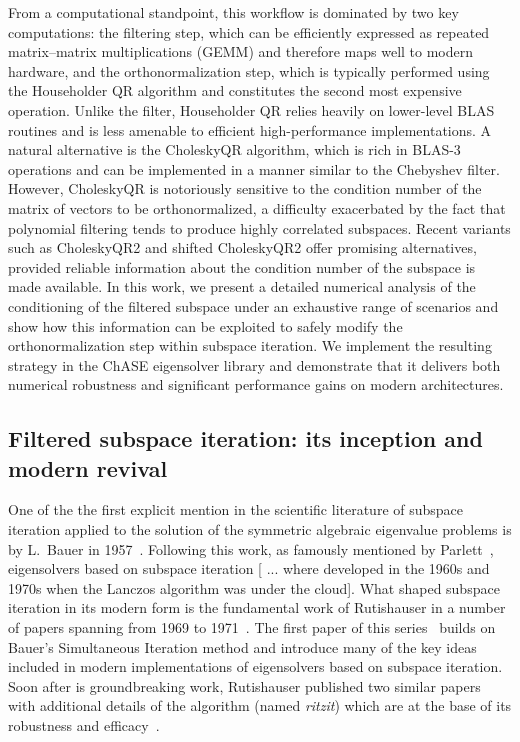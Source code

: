 From a computational standpoint, this workflow is dominated by two key computations: the filtering step, which can be efficiently expressed as repeated matrix–matrix multiplications (GEMM) and therefore maps well to modern hardware, and the orthonormalization step, which is typically performed using the Householder QR algorithm and constitutes the second most expensive operation. Unlike the filter, Householder QR relies heavily on lower-level BLAS routines and is less amenable to efficient high-performance implementations. A natural alternative is the CholeskyQR algorithm, which is rich in BLAS-3 operations and can be implemented in a manner similar to the Chebyshev filter. However, CholeskyQR is notoriously sensitive to the condition number of the matrix of vectors to be orthonormalized, a difficulty exacerbated by the fact that polynomial filtering tends to produce highly correlated subspaces. Recent variants such as CholeskyQR2 \cite{fukaya2014choleskyqr2} and shifted 
CholeskyQR2 \cite{fukaya2020shifted} offer promising alternatives, provided reliable information about the condition number of the subspace is made available. In this work, we present a detailed numerical analysis of the conditioning of the filtered subspace under an exhaustive range of scenarios and show how this information can be exploited to safely modify the 
orthonormalization step within subspace iteration. We implement the resulting strategy in 
the ChASE eigensolver library and demonstrate that it delivers both numerical robustness and significant performance gains on modern architectures.


\subsection{Filtered subspace iteration: its inception and modern revival}
One of the the first explicit mention in the scientific literature of
subspace iteration applied to the solution of the symmetric algebraic
eigenvalue problems is by L.~Bauer in
1957~\cite{Bauer:1957hv}. Following this work, as famously mentioned
by Parlett~\cite{Parlett:1998tv}, eigensolvers based on subspace
iteration [ ... where developed in the 1960s and 1970s when the
Lanczos algorithm was under the cloud]. What shaped subspace
iteration in its modern form is the fundamental work of Rutishauser in
a number of papers spanning from 1969 to
1971~\cite{Rutishauser:1969ub, Rutishauser:1971wc,
  Rutishauser:1970wc}. The first paper of this
series~\cite{Rutishauser:1969ub} builds on Bauer's Simultaneous
Iteration method and introduce many of the key ideas included in
modern implementations of eigensolvers based on subspace
iteration. Soon after is groundbreaking work, Rutishauser published
two similar papers with additional details of the algorithm (named {\it
  ritzit}) which are at the base of its robustness and
efficacy~\cite{Rutishauser:1970wc, Rutishauser:1971wc}.

